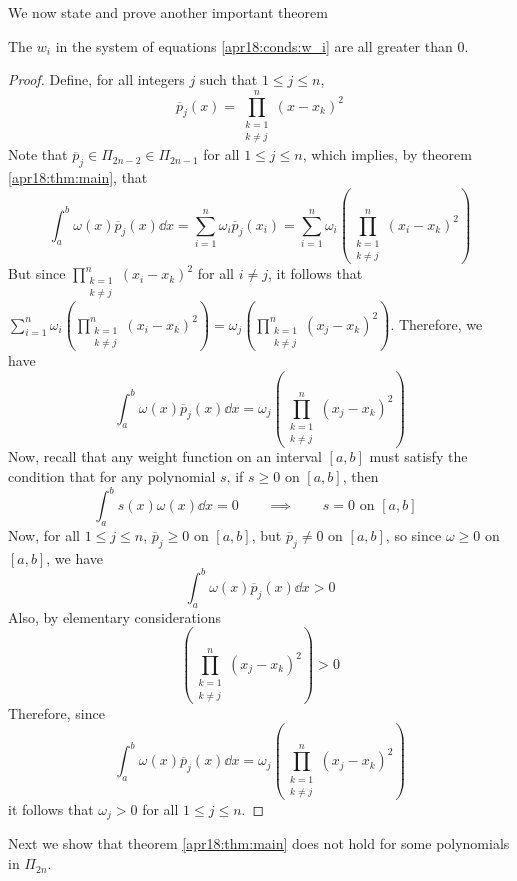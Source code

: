 We now state and prove another important theorem
\begin{thm}
  The $w_i$ in the system of equations \ref{apr18:conds:w_i} are all greater than 0.
\end{thm}
\begin{proof}
  Define, for all integers $j$ such that $1 \leq j \leq n$,
  \[
    \overline{p}_j(x) = \prod_{\substack{k = 1 \\ k \neq j}}^n (x - x_k)^2
  \]
  Note that $\overline{p}_j \in \Pi_{2n-2} \in \Pi_{2n-1}$ for all $1 \leq j \leq n$, which implies, by theorem \ref{apr18:thm:main}, that
  \[
    \int_a^b \omega(x) \overline{p}_j(x) \dd{x}
    = \sum_{i=1}^n \omega_i \overline{p}_j(x_i)
    = \sum_{i=1}^n \omega_i\left(\prod_{\substack{k = 1 \\ k \neq j}}^n (x_i - x_k)^2 \right)
  \]
  But since $\prod\limits_{\substack{k = 1 \\ k \neq j}}^n (x_i - x_k)^2$ for all $i \neq j$, it follows that $\sum_{i=1}^n \omega_i\left(\prod\limits_{\substack{k = 1 \\ k \neq j}}^n (x_i - x_k)^2 \right) = \omega_j\left(\prod\limits_{\substack{k = 1 \\ k \neq j}}^n (x_j - x_k)^2 \right)$. Therefore, we have
  \[
    \int_a^b \omega(x) \overline{p}_j(x) \dd{x}
    = \omega_j\left(\prod\limits_{\substack{k = 1 \\ k \neq j}}^n (x_j - x_k)^2 \right)
  \]
  Now, recall that any weight function on an interval $[a, b]$ must satisfy the condition that for any polynomial $s$, if $s \geq 0$ on $[a, b]$, then
  \[
    \int_a^b s(x) \omega(x) \dd{x} = 0
    \qquad \implies \qquad
    s = 0 \text{ on $[a, b]$ }
  \]
  Now, for all $1 \leq j \leq n$, $\overline{p}_j \geq 0$ on $[a, b]$, but $\overline{p}_j \neq 0$ on $[a, b]$, so since $\omega \geq 0$ on $[a, b]$, we have
  \[
    \int_a^b \omega(x) \overline{p}_j(x) \dd{x} > 0
  \]
  Also, by elementary considerations
  \[
    \left(\prod\limits_{\substack{k = 1 \\ k \neq j}}^n (x_j - x_k)^2 \right) > 0
  \]
  Therefore, since
  \[
    \int_a^b \omega(x) \overline{p}_j(x) \dd{x}
    = \omega_j\left(\prod\limits_{\substack{k = 1 \\ k \neq j}}^n (x_j - x_k)^2 \right)
  \]
  it follows that $\omega_j > 0$ for all $1 \leq j \leq n$.
  \hfill
\end{proof}

Next we show that theorem \ref{apr18:thm:main} does not hold for some polynomials in $\Pi_{2n}$.

